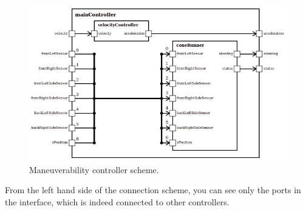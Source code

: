 \begin{figure}[ht]
    \centering
    \includegraphics[width=0.8\linewidth]{src/pic/controller04}
    \caption{Maneuverability controller scheme.}
    \label{fig:maneuverability-scheme}
\end{figure}
From the left hand side of the connection scheme, you can see only the ports in the interface, which is indeed connected to other controllers.
